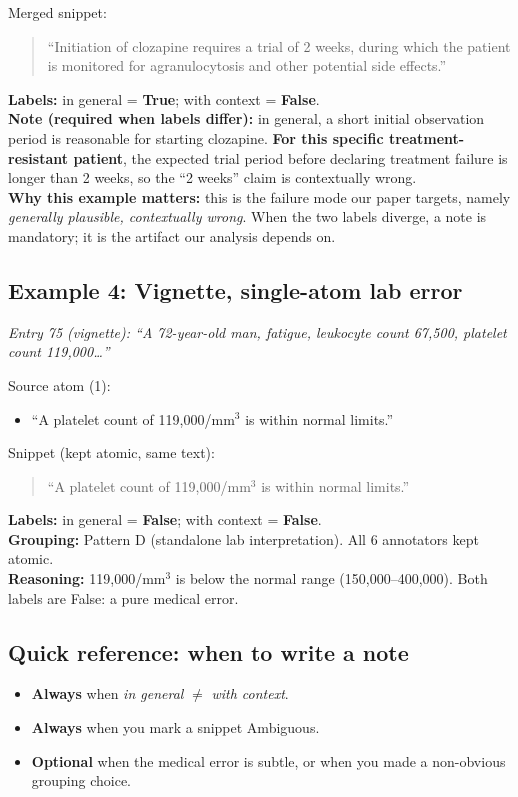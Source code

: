 \documentclass{article}
\begin{document}
\noindent Merged snippet:
\begin{quote}
``Initiation of clozapine requires a trial of 2 weeks, during which the patient is monitored for agranulocytosis and other potential side effects.''
\end{quote}

\noindent\textbf{Labels:} in general = \textbf{True}; with context = \textbf{False}. \\
\noindent\textbf{Note (required when labels differ):} in general, a short initial observation period is reasonable for starting clozapine. \textbf{For this specific treatment-resistant patient}, the expected trial period before declaring treatment failure is longer than 2 weeks, so the ``2 weeks'' claim is contextually wrong. \\
\noindent\textbf{Why this example matters:} this is the failure mode our paper targets, namely \textit{generally plausible, contextually wrong}. When the two labels diverge, a note is mandatory; it is the artifact our analysis depends on.

\subsection*{Example 4: Vignette, single-atom lab error}
\textit{Entry 75 (vignette): ``A 72-year-old man, fatigue, leukocyte count 67{,}500, platelet count 119{,}000\ldots{}''}

\medskip
\noindent Source atom (1):
\begin{itemize}[leftmargin=1.8em,labelsep=0.5em,itemsep=2pt,topsep=3pt]
    \item[\textit{atom 1:}] ``A platelet count of 119{,}000/mm$^3$ is within normal limits.''
\end{itemize}

\noindent Snippet (kept atomic, same text):
\begin{quote}
``A platelet count of 119{,}000/mm$^3$ is within normal limits.''
\end{quote}

\noindent\textbf{Labels:} in general = \textbf{False}; with context = \textbf{False}. \\
\noindent\textbf{Grouping:} Pattern D (standalone lab interpretation). All 6 annotators kept atomic. \\
\noindent\textbf{Reasoning:} 119{,}000/mm$^3$ is below the normal range (150{,}000--400{,}000). Both labels are False: a pure medical error.

\subsection*{Quick reference: when to write a note}
\begin{itemize}[leftmargin=*,itemsep=2pt]
    \item \textbf{Always} when \textit{in general} $\neq$ \textit{with context}.
    \item \textbf{Always} when you mark a snippet Ambiguous.
    \item \textbf{Optional} when the medical error is subtle, or when you made a non-obvious grouping choice.
\end{itemize}
\end{document}
